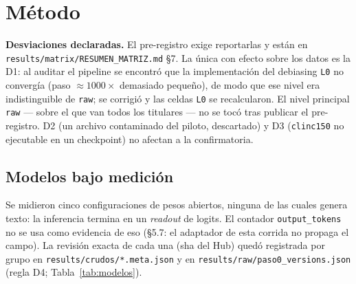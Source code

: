 \section{Método}
\label{sec:metodo}

\textbf{Desviaciones declaradas.} El pre-registro exige reportarlas y están en
\texttt{results/matrix/RESUMEN\_MATRIZ.md} §7. La única con efecto sobre los datos es la D1: al
auditar el pipeline se encontró que la implementación del debiasing \texttt{L0} no convergía (paso
$\approx 1000\times$ demasiado pequeño), de modo que ese nivel era indistinguible de \texttt{raw}; se
corrigió y las celdas \texttt{L0} se recalcularon. El nivel principal \texttt{raw} ---
sobre el que van todos los titulares --- no se tocó tras publicar el pre-registro. D2 (un archivo
contaminado del piloto, descartado) y D3 (\texttt{clinc150} no ejecutable en un checkpoint) no afectan a la
confirmatoria.

\subsection{Modelos bajo medición}

Se midieron cinco configuraciones de pesos abiertos, ninguna de las cuales genera texto: la inferencia termina
en un \emph{readout} de logits. El contador \texttt{output\_tokens} no se usa como evidencia de eso (§5.7: el
adaptador de esta corrida no propaga el campo). La revisión exacta de cada una (sha del Hub) quedó registrada
por grupo en \texttt{results/crudos/*.meta.json} y en \texttt{results/raw/paso0\_versions.json} (regla D4;
Tabla~\ref{tab:modelos}).

\begin{table}[t]
\centering
\caption{Las cinco configuraciones de pesos abiertos medidas. Ninguna genera texto: la inferencia termina en un
\emph{readout} de logits. La última es un control crudo, no entrenado para emitir decisiones.}
\label{tab:modelos}
{\scriptsize
\setlength{\tabcolsep}{3pt}
}
\end{table}

